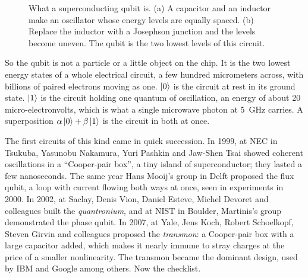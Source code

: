 \begin{figure}[htbp]
\caption{What a superconducting qubit is. (a) A capacitor and an inductor make an
oscillator whose energy levels are equally spaced. (b) Replace the inductor with a
Josephson junction and the levels become uneven. The qubit is the two lowest levels of
this circuit.}\label{fig:ladder}
\end{figure}

So the qubit is not a particle or a little object on the chip. It is the two lowest
energy states of a whole electrical circuit, a few hundred micrometers across, with
billions of paired electrons moving as one. $\ket0$ is the circuit at rest in its
ground state. $\ket1$ is the circuit holding one quantum of oscillation, an energy of
about 20 micro-electronvolts, which is what a single microwave photon at 5~GHz
carries. A superposition $\alpha\ket0 + \beta\ket1$ is the circuit in both at once.

The first circuits of this kind came in quick succession. In 1999, at NEC in Tsukuba,
Yasunobu Nakamura, Yuri Pashkin and Jaw-Shen Tsai showed coherent oscillations in a
``Cooper-pair box'', a tiny island of superconductor; they lasted a few nanoseconds.
The same year Hans Mooij's group in Delft proposed the flux qubit, a loop with current
flowing both ways at once, seen in experiments in 2000. In 2002, at Saclay, Denis Vion,
Daniel Esteve, Michel Devoret and colleagues built the \emph{quantronium}, and at NIST
in Boulder, Martinis's group demonstrated the phase qubit. In 2007, at Yale, Jens Koch,
Robert Schoelkopf, Steven Girvin and colleagues proposed the \emph{transmon}: a
Cooper-pair box with a large capacitor added, which makes it nearly immune to stray
charges at the price of a smaller nonlinearity. The transmon became the dominant
design, used by IBM and Google among others. Now the checklist.

